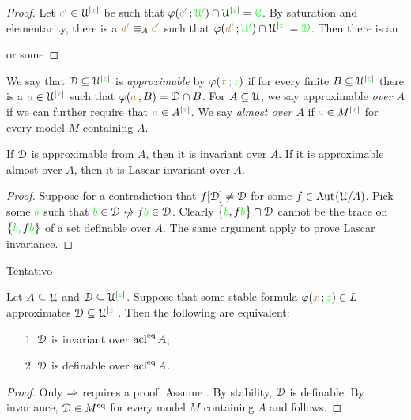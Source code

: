 \documentclass[creche.tex]{subfiles}
\begin{document}
{\begin{proof}
Let ${\color{brown} c'}\in\EuScript U^{|{\color{brown} x}|}$ be such that $\varphi({\color{brown} c'}\,;{\color{green}\EuScript U'})\cap\EuScript U^{|{\color{green} z}|}={\color{green}\EuScript C}$. By saturation and elementarity, there is a ${\color{brown} d'}\equiv_A{\color{brown} c'}$ such that $\varphi({\color{brown} d'}\,;{\color{green}\EuScript U'})\cap\EuScript U^{|{\color{green} z}|}={\color{green}\EuScript D}$. Then there is an 

or some 
\end{proof}


We say that $\EuScript D\subseteq\EuScript U^{|{\color{green} z}|}$ is \emph{approximable\/} by $\varphi({\color{brown} x}\,;{\color{green} z})$ if for every finite $B\subseteq\EuScript U^{|{\color{green} z}|}$ there is a ${\color{brown} a}\in\EuScript U^{|{\color{brown} x}|}$ such that $\varphi({\color{brown} a}\,;B)=\EuScript D\cap B$. For $A\subseteq\EuScript U$, we say approximable \emph{over $A$\/} if we can further require that ${\color{brown} a}\in A^{|{\color{brown} x}|}$. We say \emph{almost over $A$\/} if  ${\color{brown} a}\in M^{|{\color{brown} x}|}$ for every model $M$ containing $A$.

\begin{proposition}
If\/ $\EuScript D$ is\/ approximable from $A$, then it is invariant over $A$. If it is\/ ap\-prox\-i\-ma\-ble almost over $A$, then it is Lascar invariant over $A$.
\end{proposition}

\begin{proof}
Suppose for a contradiction that $f[\EuScript D]\neq\EuScript D$ for some $f\in\textrm{Aut\kern.15ex}(\EuScript U/A)$. Pick some ${\color{green} b}$ such that ${\gr b}\in\D\niff f{\gr b}\in\D$. Clearly $\big\{{\color{green} b},f{\color{green} b}\big\}\cap\EuScript D$ cannot be the trace on $\big\{{\color{green} b},f{\color{green} b}\big\}$ of a set definable over $A$. The same argument apply to prove Lascar invariance.
\end{proof}

Tentativo

}

\begin{proposition}
Let $A\subseteq\EuScript U$ and $\EuScript D\subseteq\EuScript U^{|{\color{green} z}|}$. Suppose that some stable formula $\varphi({\color{brown} x}\,;{\color{green} z})\in L$ approximates $\EuScript D\subseteq\EuScript U^{|{\color{green} z}|}$. Then the following are equivalent:
\begin{itemize}
\item[1.] $\EuScript D$ is invariant over $\mathop{\rm acl}^{{\rm eq}} A$;
\item[2.] $\EuScript D$ is definable over $\mathop{\rm acl}^{{\rm eq}} A$.
\end{itemize}
\end{proposition}

\begin{proof}
Only $\Rightarrow$ requires a proof. Assume . By stability, $\EuScript D$ is definable. By invariance, $\EuScript D\in M^{{\rm eq}}$ for every model $M$ containing $A$ and  follows.
\end{proof}
\end{document}
